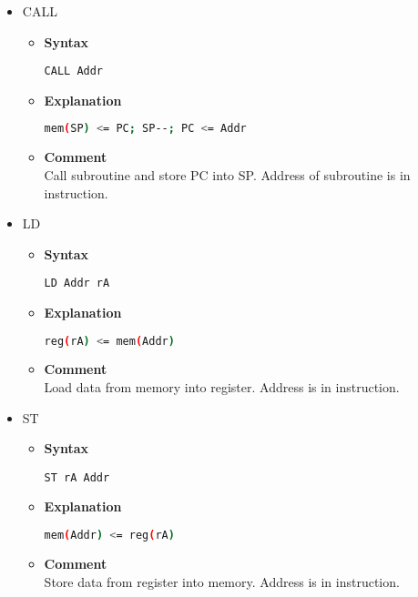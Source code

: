 \begin{itemize}
    \item CALL
    \begin{itemize}
        \item \textbf{Syntax}
        \begin{lstlisting}[language={[markII]Assembler}, frame=single]
    CALL Addr
        \end{lstlisting}
        \item \textbf{Explanation}
        \begin{lstlisting}[language=bash, frame=single]
    mem(SP) <= PC; SP--; PC <= Addr
        \end{lstlisting}
        \item \textbf{Comment} \\
    Call subroutine and store PC into SP. Address of subroutine is in instruction.
    \end{itemize}

    \item LD
    \begin{itemize}
        \item \textbf{Syntax}
        \begin{lstlisting}[language={[markII]Assembler}, frame=single]
    LD Addr rA
        \end{lstlisting}
        \item \textbf{Explanation}
        \begin{lstlisting}[language=bash, frame=single]
    reg(rA) <= mem(Addr)
        \end{lstlisting}
        \item \textbf{Comment} \\
    Load data from memory into register. Address is in instruction.
    \end{itemize}

    \item ST
    \begin{itemize}
        \item \textbf{Syntax}
        \begin{lstlisting}[language={[markII]Assembler}, frame=single]
    ST rA Addr
        \end{lstlisting}
        \item \textbf{Explanation}
        \begin{lstlisting}[language=bash, frame=single]
    mem(Addr) <= reg(rA)
        \end{lstlisting}
        \item \textbf{Comment} \\
    Store data from register into memory. Address is in instruction.
    \end{itemize}


\end{itemize}
